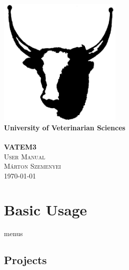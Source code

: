 \documentclass[10pt,a4paper,oneside]{report}             %
\author{\vikauthor}
\title{\viktitle}
\newcommand{\vikauthor}{Márton Szemenyei}
\newcommand{\viktitle}{VATEM3}
\newcommand{\vikdept}{}
\newcommand{\vikdoktipus}{User Manual}
\begin{document}
\singlespacing

\begin{titlepage}
\begin{center}
\includegraphics[width=60mm,keepaspectratio]{../VAM/icons/ikon01.png}\\
\vspace{0.3cm}
\textbf{University of Veterinarian Sciences}\\
\textmd{\vikdept}\\[5cm]

\vspace{0.4cm}
{\huge \bfseries \viktitle}\\[0.8cm]
\textsc{\Large \vikdoktipus}\\[2cm]
\textsc{\Large \vikauthor}\\[6cm]

\vfill
{\large \today}
\end{center}
\end{titlepage}


\singlespacing
\tableofcontents\thispagestyle{fancy}


\chapter{Basic Usage}

menus
 
\section{Projects}
\end{document}
